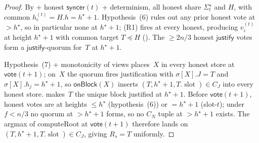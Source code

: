 \documentclass{article}
\newcommand{\slot}[0]{\ensuremath{\operatorname{\mathrm{slot}}}}
\newcommand{\just}{\ensuremath{\mathsf{justify}}\xspace}
\newcommand{\syncer}{\mathsf{syncer}}
\newcommand{\vote}{\mathsf{vote}}
\newcommand{\onBlock}{\textsf{onBlock}\xspace}
\newcommand{\computeRoot}{\textsf{computeRoot}\xspace}
\theoremstyle{plain}
\theoremstyle{definition}
\theoremstyle{remark}
\begin{document}
\begin{proof}
By  + honest $\syncer(t)$ + determinism, all honest share $\Sigma^\star_t$ and $H$, with common $h_c^{(t)} = H.h = h^\star + 1$.
Hypothesis~(6) rules out any prior honest vote at $> h^\star$, so in particular none at $h^\star + 1$; (R1) fires at every honest, producing $v^{(t)}_i$ at height $h^\star + 1$ with common target $T \preceq H$ ().
The $\geq 2n/3$ honest \just votes form a \just-quorum for~$T$ at $h^\star + 1$.

Hypothesis~(7) + monotonicity of views places~$X$ in every honest store at $\vote(t+1)$; on~$X$ the quorum fires justification with $\sigma[X].J = T$ and $\sigma[X].h_j = h^\star + 1$, so $\onBlock(X)$ inserts $(T, h^\star + 1, T.\slot) \in C_J$ into every honest store.
 makes~$T$ the unique block justified at $h^\star + 1$.
Before $\vote(t+1)$, honest votes are at heights $\leq h^\star$ (hypothesis~(6)) or $= h^\star + 1$ (slot-$t$); under $f < n/3$ no quorum at $> h^\star + 1$ forms, so no $C_N$ tuple at $> h^\star + 1$ exists.
The argmax of \computeRoot at $\vote(t+1)$ therefore lands on $(T, h^\star + 1, T.\slot) \in C_J$, giving $R_s = T$ uniformly.
\end{proof}
\end{document}
